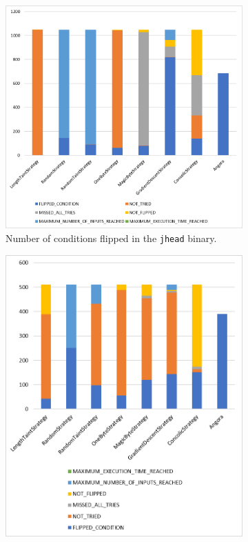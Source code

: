 \begin{figure}[H]
    \centering
    \begin{subfigure}[b]{0.49\textwidth}
        \centering
        \includegraphics[width=.8\linewidth]{5_results/graphs/jhead-status.png}  
        \caption{Number of conditions flipped in the  \texttt{jhead} binary.}
        \label{fig:jheadStatus}
    \end{subfigure}
    \hfill
    \begin{subfigure}[b]{0.49\textwidth}
        \centering
        \includegraphics[width=.8\linewidth]{5_results/graphs/djpeg-status.png}  

\end{subfigure}
\end{figure}
